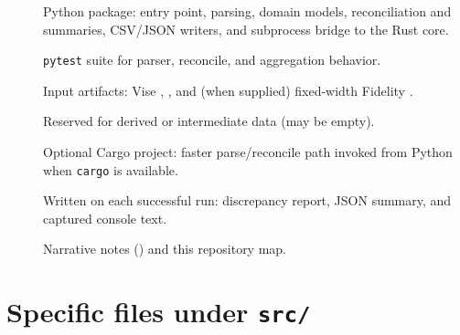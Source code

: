 \documentclass[11pt,a4paper]{article}
\begin{document}
\begin{description}
  \item[] Python package: entry point, parsing, domain models, reconciliation and summaries, CSV/JSON writers, and subprocess bridge to the Rust core.
  \item[] \texttt{pytest} suite for parser, reconcile, and aggregation behavior.
  \item[] Input artifacts: Vise , , and (when supplied) fixed-width Fidelity .
  \item[] Reserved for derived or intermediate data (may be empty).
  \item[] Optional Cargo project: faster parse/reconcile path invoked from Python when \texttt{cargo} is available.
  \item[] Written on each successful run: discrepancy report, JSON summary, and captured console text.
  \item[] Narrative notes () and this repository map.
\end{description}

\section[Specific files under src]{Specific files under \texttt{src/}}
\end{document}

